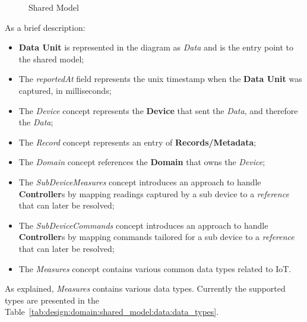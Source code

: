 \begin{figure}[H]
   \centering
  \resizebox{\columnwidth}{!}
  {
     
  }
  \caption[Shared Model]{Shared Model}
  \label{fig:design:domain:shared_model:data:diagram}
\end{figure}

As a brief description:

\begin{itemize}
   \item \textbf{Data Unit} is represented in the diagram as \textit{Data} and is the entry point to the shared model;
   \item The \textit{reportedAt} field represents the unix timestamp when the \textbf{Data Unit} was captured, in milliseconds;
   \item The \textit{Device} concept represents the \textbf{Device} that sent the \textit{Data}, and therefore the \textit{Data};
   \item The \textit{Record} concept represents an entry of \textbf{Records/Metadata};
   \item The \textit{Domain} concept references the \textbf{Domain} that owns the \textit{Device};
   \item The \textit{SubDeviceMeasures} concept introduces an approach to handle \textbf{Controller}s by mapping readings captured by a sub device to a \textit{reference} that can later be resolved;
   \item The \textit{SubDeviceCommands} concept introduces an approach to handle \textbf{Controller}s by mapping commands tailored for a sub device to a \textit{reference} that can later be resolved;
   \item The \textit{Measures} concept contains various common data types related to \gls{IoT}.
\end{itemize}

As explained, \textit{Measures} contains various data types. Currently the supported types are presented in the Table~\ref{tab:design:domain:shared_model:data:data_types}.

